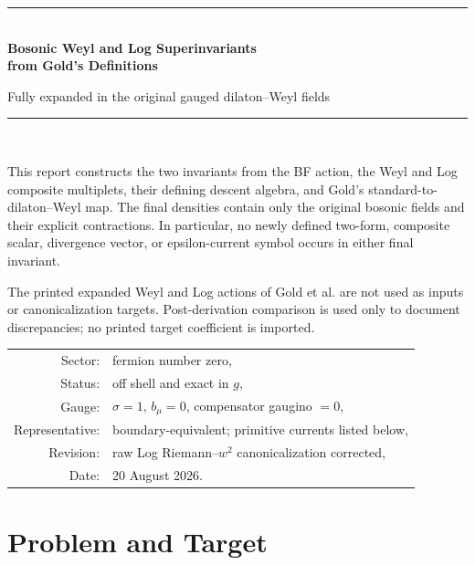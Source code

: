 \documentclass[11pt]{article}
\begin{document}

\begin{titlepage}
\centering
\vspace*{0.9cm}
{\color{navy}\rule{\textwidth}{1.2pt}}\\[0.60cm]
{\Huge\bfseries Bosonic Weyl and Log Superinvariants\\[0.22cm]
from Gold's Definitions}\par
\vspace{0.45cm}
{\Large Fully expanded in the original gauged dilaton--Weyl fields}\par
\vspace{0.55cm}
{\color{navy}\rule{\textwidth}{1.2pt}}\\[0.8cm]

\begin{minipage}{0.91\textwidth}
\large
This report constructs the two invariants from the BF action, the Weyl and
Log composite multiplets, their defining descent algebra, and Gold's
standard-to-dilaton--Weyl map.  The final densities contain only the original
bosonic fields and their explicit contractions.  In particular, no newly
defined two-form, composite scalar, divergence vector, or epsilon-current
symbol occurs in either final invariant.

The printed expanded Weyl and Log actions of Gold et al. are not used as
inputs or canonicalization targets.  Post-derivation comparison is used only
to document discrepancies; no printed target coefficient is imported.
\end{minipage}

\vfill
\begin{tabular}{rl}
Sector: & fermion number zero,\\
Status: & off shell and exact in $g$,\\
Gauge: & $\sigma=1$, $b_\mu=0$, compensator gaugino $=0$,\\
Representative: & boundary-equivalent; primitive currents listed below,\\
Revision: & raw Log Riemann--$w^2$ canonicalization corrected,\\
Date: & 20 August 2026.
\end{tabular}
\vspace{0.65cm}
\end{titlepage}
\setcounter{page}{2}

\begingroup
\small
\setlength{\parskip}{0pt}
\tableofcontents
\endgroup
\newpage
{}

\section{Problem and Target}
\end{document}
